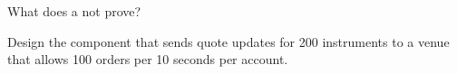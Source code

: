\begin{interviewq}\label{iq:m3:centralised-exchanges:5}
What does a  not prove?
\end{interviewq}

\begin{interviewq}\label{iq:m3:centralised-exchanges:6}
Design the component that sends quote updates for 200 instruments to a venue that allows 100 orders per 10
seconds per account.
\end{interviewq}

